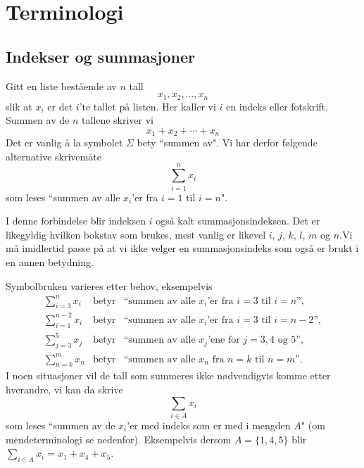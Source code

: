 \chapter{Terminologi}
\label{kap:terminologi} %

\section{Indekser og summasjoner}


Gitt en liste bestående av $n$ tall
\[ x_1, x_2, \ldots , x_n \]
slik at $x_i$ er det $i$'te tallet på listen. Her kaller vi $i$ en indeks 
eller fotskrift. Summen av de $n$ tallene skriver vi
\[ x_1 + x_2 + \cdots + x_n \]
Det er vanlig å la symbolet $\Sigma$ bety ``summen av". Vi har derfor følgende 
alternative skrivemåte
\[ \sum_{i=1}^{n} x_i   \]
som leses ``summen av alle $x_i$'er fra $i=1$ til $i=n$".

I denne forbindelse blir indeksen $i$ også kalt summasjonsindeksen.
Det er likegyldig hvilken bokstav som brukes, mest vanlig er likevel $i$,
$j$, $k$, $l$, $m$ og $n$.Vi må imidlertid passe på at vi ikke velger en
summasjonsindeks som også er brukt i en annen betydning.

Symbolbruken varieres etter behov, eksempelvis
\begin{eqnarray*}
\sum_{i=3}^{n} x_i  &  \mbox{betyr} & 
    \mbox{``summen av alle $x_i$'er fra $i=3$ til $i=n$''},\\
\sum_{i=1}^{n-2} x_i&  \mbox{betyr} & 
    \mbox{``summen av alle $x_i$'er fra $i=3$ til $i=n-2$''},\\
\sum_{j=3}^{5} x_j &  \mbox{betyr}  & 
    \mbox{``summen av alle $x_j$'ene for  $j=3, 4$ og 5''},\\
\sum_{n=k}^{m} x_n &  \mbox{betyr}  & 
    \mbox{``summen av alle $x_n$ fra $n=k$ til $n=m$''}.
\end{eqnarray*}
I noen situasjoner vil de tall som summeres ikke nødvendigvis komme etter
hverandre, vi kan da skrive
\[ \sum_{i\in A} x_i   \]
som leses ``summen av de $x_i$'er med indeks som er med i mengden $A$"
(om mendeterminologi se nedenfor). Eksempelvis dersom $A=\{1,4,5\}$ blir
$\sum_{i\in A} x_i =  x_1 + x_4 + x_5$.

